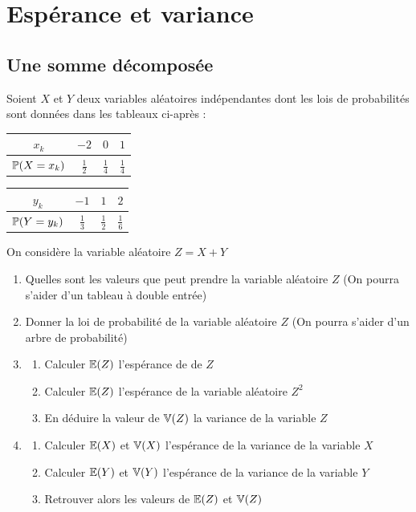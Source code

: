 \documentclass[oneside,12pt]{book}          %
\begin{document}
\section{Espérance et variance}

\subsection{Une somme décomposée}
Soient $X$ et $Y$ deux variables aléatoires indépendantes dont les lois de probabilités sont données dans les tableaux ci-après :

\begin{center}
\setlength{\tabcolsep}{10pt}
\renewcommand{\arraystretch}{1.5}
\begin{tabular}{|c|c|c|c|} \hline
    $x_k$ & $-2$ & $0$ & $1$ \\ \hline
    ${\mathbb P}(X=x_k)$ & $\frac{1}{2}$ & $\frac{1}{4}$ & $\frac{1}{4}$ \\\hline
\end{tabular}
\hspace{1.5cm}
\renewcommand{\arraystretch}{1.5}
\begin{tabular}{|c|c|c|c|} \hline
    $y_k$ & $-1$ & $1$ & $2$ \\ \hline
    ${\mathbb P}(Y=y_k)$ & $\frac{1}{3}$ & $\frac{1}{2}$ & $\frac{1}{6}$ \\\hline
\end{tabular}
\end{center}

On considère la variable aléatoire $Z=X+Y$
\begin{enumerate}
    \item Quelles sont les valeurs que peut prendre la variable aléatoire $Z$ (On pourra s'aider d'un tableau à double entrée)
    \item Donner la loi de probabilité de la variable aléatoire $Z$ (On pourra s'aider d'un arbre de probabilité)
    \item \begin{enumerate}
        \item Calculer ${\mathbb E}(Z)$ l'espérance de de $Z$
        \item Calculer ${\mathbb E}(Z)$ l'espérance de la variable aléatoire $Z^2$
        \item En déduire la valeur de ${\mathbb V}(Z)$ la variance de la variable $Z$
    \end{enumerate}
    \item \begin{enumerate}
        \item Calculer ${\mathbb E}(X)$ et ${\mathbb V}(X)$ l'espérance de la variance de la variable $X$
        \item Calculer ${\mathbb E}(Y)$ et ${\mathbb V}(Y)$ l'espérance de la variance de la variable $Y$
        \item Retrouver alors les valeurs de ${\mathbb E}(Z)$ et ${\mathbb V}(Z)$
    \end{enumerate}
\end{enumerate}
\end{document}

